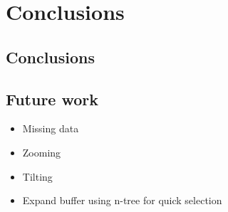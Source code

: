 \chapter{Conclusions}
\label{ch:conclusion}
\section{Conclusions}
\section{Future work}
\begin{itemize}
  \item Missing data
  \item Zooming
  \item Tilting
  \item Expand buffer using n-tree for quick selection
\end{itemize}
